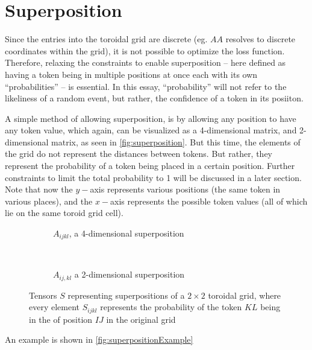 
\section{Superposition}%
\label{sec:superposition}
Since the entries into the toroidal grid are discrete (eg. $AA$ resolves to discrete coordinates within the grid), it is not possible to optimize the loss function. Therefore, relaxing the constraints to enable superposition -- here defined as having a token being in multiple positions at once each with its own ``probabilities'' -- is essential. In this essay, ``probability'' will not refer to the likeliness of a random event, but rather, the confidence of a token in its posiiton.

A simple method of allowing superposition, is by allowing any position to have any token value, which again, can be visualized as a 4-dimensional matrix, and 2-dimensional matrix, as seen in \autoref{fig:superposition}. But this time, the elements of the grid do not represent the distances between tokens. But rather, they represent the probability of a token being placed in a certain position. Further constraints to limit the total probability to 1 will be discussed in a later section. Note that now the $y-$axis represents various positions (the same token in various places), and the $x-$axis represents the possible token values (all of which lie on the same toroid grid cell).
\begin{figure}[htpb]
    \centering
    \begin{subfigure}[t]{0.5\textwidth}
    \begin{center}
    \end{center}
    \caption{$A_{ijkl}$, a 4-dimensional superposition}
    \end{subfigure}%
    ~
    \begin{subfigure}[t]{0.5\textwidth}
    \begin{center}
    \end{center}
    \caption{$A_{ij,kl}$ a 2-dimensional superposition}
    \end{subfigure}

    \caption{Tensors $S$ representing superpositions of a $2\times 2$ toroidal grid, where every element $S_{ijkl}$ represents the probability of the token $KL$ being in the of position $IJ$ in the original grid}%
    \label{fig:superposition}
\end{figure}

An example is shown in \autoref{fig:superpositionExample}

